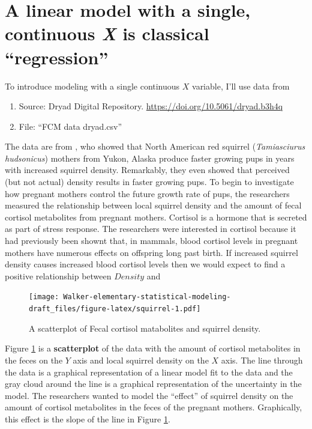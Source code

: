 \documentclass[]{book}
\providecommand{\tightlist}{%
  \setlength{\itemsep}{0pt}\setlength{\parskip}{0pt}}
\begin{document}
\section{\texorpdfstring{A linear model with a single, continuous
\emph{X} is classical
``regression''}{A linear model with a single, continuous X is classical regression}}\label{a-linear-model-with-a-single-continuous-x-is-classical-regression}

To introduce modeling with a single continuous \(X\) variable, I'll use
data from

\begin{enumerate}
\def\labelenumi{\arabic{enumi}.}
\tightlist
\item
  Source: Dryad Digital Repository.
  \url{https://doi.org/10.5061/dryad.b3h4q}
\item
  File: ``FCM data dryad.csv''
\end{enumerate}

The data are from \citet{Dantzer_xxx}, who showed that North American
red squirrel (\emph{Tamiasciurus hudsonicus}) mothers from Yukon, Alaska
produce faster growing pups in years with increased squirrel density.
Remarkably, they even showed that perceived (but not actual) density
results in faster growing pups. To begin to investigate how pregnant
mothers control the future growth rate of pups, the researchers measured
the relationship between local squirrel density and the amount of fecal
cortisol metabolites from pregnant mothers. Cortisol is a hormone that
is secreted as part of stress response. The researchers were interested
in cortisol because it had previously been shownt that, in mammals,
blood cortisol levels in pregnant mothers have numerous effects on
offspring long past birth. If increased squirrel density causes
increased blood cortisol levels then we would expect to find a positive
relationship between \(Density\) and

\begin{figure}
\centering
\texttt{[image: Walker-elementary-statistical-modeling-draft\_files/figure-latex/squirrel-1.pdf]}
\caption{\label{fig:squirrel}A scatterplot of Fecal cortisol matabolites and
squirrel density.}
\end{figure}

Figure \ref{fig:squirrel} is a \textbf{scatterplot} of the data with the
amount of cortisol metabolites in the feces on the \(Y\) axis and local
squirrel density on the \(X\) axis. The line through the data is a
graphical representation of a linear model fit to the data and the gray
cloud around the line is a graphical representation of the uncertainty
in the model. The researchers wanted to model the ``effect'' of squirrel
density on the amount of cortisol metabolites in the feces of the
pregnant mothers. Graphically, this effect is the slope of the line in
Figure \ref{fig:squirrel}.
\end{document}
